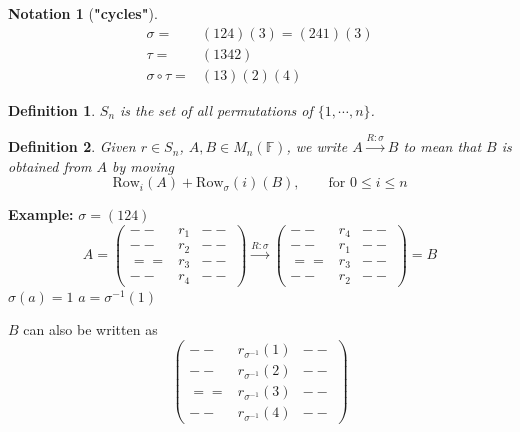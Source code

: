 \documentclass[12pt]{article}
\theoremstyle{plain}
\newtheorem{definition}{Definition}[subsection]
\newtheorem{notation}{Notation}[subsection]
\newcommand{\Row}{\mathrm{Row}}
\newcommand{\mF}{{\mathbb{F}}}
\begin{document}
\begin{notation}[\textbf{"cycles"}]
	\begin{align*}
		\sigma =& (1 2 4)(3) = (2 4 1)(3) \\
		\tau =& (1 3 4 2)\\
		\sigma \circ \tau =& (1 3)(2)(4)
	\end{align*}
\end{notation}

\begin{definition}
	$S_n$ is the set of all permutations of $\{1, \cdots, n\}$. 
\end{definition}

\begin{definition}
	Given $r \in S_n$, $A, B \in M_n(\mF)$, we write
	$A \overset{R:\sigma}{\longrightarrow} B$ to mean that $B$ is obtained from
	$A$ by moving 
	\[
		\Row_i(A) + \Row_{\sigma} (i)(B), \qquad \text{for } 0 \leq i \leq n
	\]
\end{definition}

{\color{Brown}
	\textbf{Example: }
	$\sigma = (1 2 4)$
	\[
		A = 
		\begin{pmatrix}
			-- & r_1 & -- \\
			-- & r_2 & -- \\
			== & r_3 & -- \\
			-- & r_4 & -- 
		\end{pmatrix}
		\overset{R: \sigma}{\longrightarrow} 
		\begin{pmatrix}
			-- & r_4 & -- \\
			-- & r_1 & -- \\
			== & r_3 & -- \\
			-- & r_2 & -- 
		\end{pmatrix}
		=B
	\]
	$\sigma(a)=1$ $a = \sigma^{-1}(1)$

	$B$ can also be written as 
	\[
		\begin{pmatrix}
			-- & r_{\sigma^{-1}}(1) & -- \\
			-- & r_{\sigma^{-1}}(2) & -- \\
			== & r_{\sigma^{-1}}(3) & -- \\
			-- & r_{\sigma^{-1}}(4) & -- 
		\end{pmatrix}
	\]
}
\end{document}
